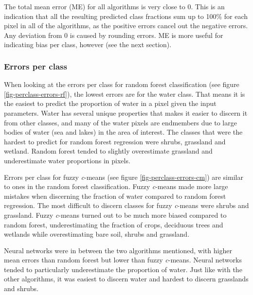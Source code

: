 \documentclass[a4paper,10pt]{book}
\begin{document}
The total mean error (ME) for all algorithms is very close to 0. This is an indication that all the resulting predicted class fractions sum up to 100\% for each pixel in all of the algorithms, as the positive errors cancel out the negative errors. Any deviation from 0 is caused by rounding errors. ME is more useful for indicating bias per class, however (see the next section).

\subsubsection{Errors per class}

When looking at the errors per class for random forest classification (see figure \ref{fig-perclass-errors-rf}), the lowest errors are for the water class. That means it is the easiest to predict the proportion of water in a pixel given the input parameters. Water has several unique properties that makes it easier to discern it from other classes, and many of the water pixels are endmembers due to large bodies of water (sea and lakes) in the area of interest. The classes that were the hardest to predict for random forest regression were shrubs, grassland and wetland. Random forest tended to slightly overestimate grassland and underestimate water proportions in pixels.

Errors per class for fuzzy \textit{c}-means (see figure \ref{fig-perclass-errors-cm}) are similar to ones in the random forest classification. Fuzzy \textit{c}-means made more large mistakes when discerning the fraction of water compared to random forest regression. The most difficult to discern classes for fuzzy \textit{c}-means were shrubs and grassland. Fuzzy \textit{c}-means turned out to be much more biased compared to random forest, underestimating the fraction of crops, deciduous trees and wetlands while overestimating bare soil, shrubs and grassland.

Neural networks were in between the two algorithms mentioned, with higher mean errors than random forest but lower than fuzzy \textit{c}-means. Neural networks tended to particularly underestimate the proportion of water. Just like with the other algorithms, it was easiest to discern water and hardest to discern grasslands and shrubs.
\end{document}
